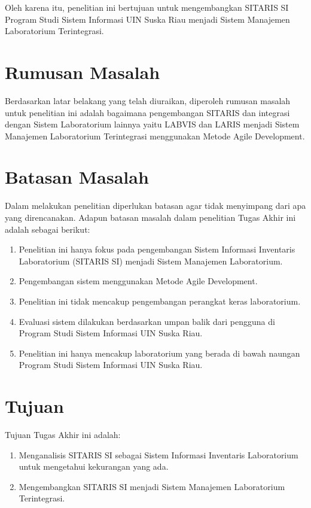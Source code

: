 Oleh karena itu, penelitian ini bertujuan untuk mengembangkan SITARIS SI Program Studi Sistem Informasi UIN Suska Riau menjadi Sistem Manajemen Laboratorium Terintegrasi.
\section{Rumusan Masalah}
Berdasarkan latar belakang yang telah diuraikan, diperoleh rumusan masalah untuk penelitian ini adalah bagaimana pengembangan SITARIS dan integrasi dengan Sistem Laboratorium lainnya yaitu LABVIS dan LARIS menjadi Sistem Manajemen Laboratorium Terintegrasi menggunakan Metode Agile Development.

\section{Batasan Masalah}
Dalam melakukan penelitian diperlukan batasan agar tidak menyimpang dari apa yang direncanakan. Adapun batasan masalah dalam penelitian Tugas Akhir ini adalah sebagai berikut:
\begin{enumerate}
	\item Penelitian ini hanya fokus pada pengembangan Sistem Informasi Inventaris Laboratorium (SITARIS SI) menjadi Sistem Manajemen Laboratorium.
	\item Pengembangan sistem menggunakan Metode Agile Development.
	\item Penelitian ini tidak mencakup pengembangan perangkat keras laboratorium.
	\item Evaluasi sistem dilakukan berdasarkan umpan balik dari pengguna di Program Studi Sistem Informasi UIN Suska Riau.
	\item Penelitian ini hanya mencakup laboratorium yang berada di bawah naungan Program Studi Sistem Informasi UIN Suska Riau.
\end{enumerate}

\section{Tujuan}
Tujuan Tugas Akhir ini adalah:
\begin{enumerate}
	\item Menganalisis SITARIS SI sebagai Sistem Informasi Inventaris Laboratorium untuk mengetahui kekurangan yang ada.
	\item Mengembangkan SITARIS SI menjadi Sistem Manajemen Laboratorium Terintegrasi.
\end{enumerate}

